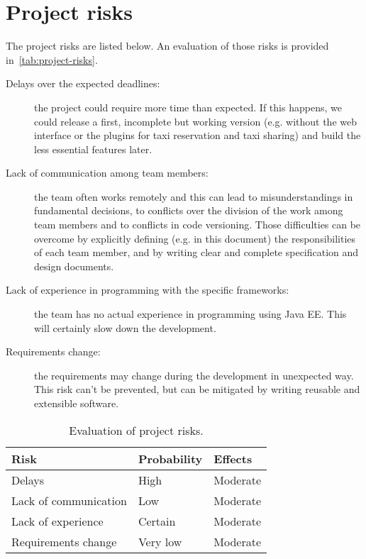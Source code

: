 \section{Project risks}

The project risks are listed below. An evaluation of those risks is provided in~\autoref{tab:project-risks}.

\begin{description}
    \item[Delays over the expected deadlines:] the project could require more time than expected. If this happens, we could release a first, incomplete but working version (e.g. without the web interface or the plugins for taxi reservation and taxi sharing) and build the less essential features later.

    \item[Lack of communication among team members:] the team often works remotely and this can lead to misunderstandings in fundamental decisions, to conflicts over the division of the work among team members and to conflicts in code versioning. Those difficulties can be overcome by explicitly defining (e.g. in this document) the responsibilities of each team member, and by writing clear and complete specification and design documents.

    \item[Lack of experience in programming with the specific frameworks:] the team has no actual experience in programming using Java EE. This will certainly slow down the development.

    \item[Requirements change:] the requirements may change during the development in unexpected way. This risk can't be prevented, but can be mitigated by writing reusable and extensible software.
\end{description}

\begin{table}[p]
\centering
    \begin{tabular}{| l | l | l |}
        \hline
        \textbf{Risk}           & \textbf{Probability}  & \textbf{Effects}  \\
        \hline
        Delays                  & High                  & Moderate          \\
        \hline
        Lack of communication   & Low                   & Moderate          \\
        \hline
        Lack of experience      & Certain               & Moderate          \\
        \hline
        Requirements change     & Very low              & Moderate          \\
        \hline
    \end{tabular}
    \caption{Evaluation of project risks.}
    \label{tab:project-risks}
\end{table}
